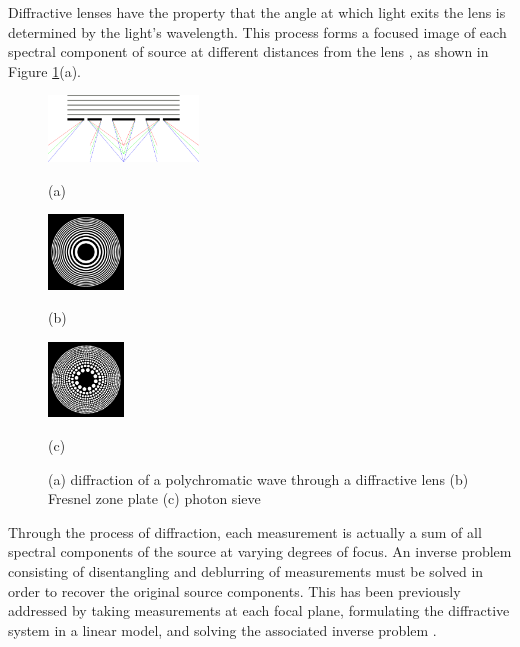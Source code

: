 \documentclass{article}
\begin{document}
Diffractive lenses have the property that the angle at which light exits the
lens is determined by the light's wavelength. This process forms a focused image
of each spectral component of source at different
distances from the lens \cite{attwood1999}, as shown in Figure
\ref{fig:diff_lens}(a).


\begin{figure}[htb]

\begin{minipage}[b]{0.48\linewidth}
  \centering
  \centerline{\includegraphics[width=4.0cm]{diffraction_ps_rgb}}
  \centerline{(a)}\medskip
\end{minipage}
\hfill
\begin{minipage}[b]{0.24\linewidth}
  \centering
  \centerline{\includegraphics[width=2.0cm]{zoneplate.png}}
  \centerline{(b)}\medskip
\end{minipage}
\hfill
\begin{minipage}[b]{0.24\linewidth}
  \centering
  \centerline{\includegraphics[width=2.0cm]{photonsieve}}
  \centerline{(c)}\medskip
\end{minipage}
\caption{(a) diffraction of a polychromatic wave through a diffractive lens (b) Fresnel zone
plate (c) photon sieve}
\label{fig:diff_lens}
%
\end{figure}

Through the process of diffraction, each measurement is actually a sum of all
spectral components of the source at varying degrees of focus. An inverse
problem consisting of disentangling and deblurring of measurements must be
solved in order to recover the original source components. This has been
previously addressed by taking measurements at each focal plane, formulating the
diffractive system in a linear model, and solving the associated inverse problem
\cite{oktem2014icip}.
\end{document}
